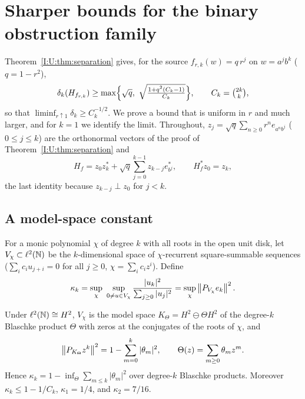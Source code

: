 \section{Sharper bounds for the binary obstruction family}\label{I:M:rev13:sec:sep}

Theorem~\ref{I:U:thm:separation} gives, for the source
$f_{r,k}(w)=q\,r^j$ on $w=a^jb^k$ ($q=1-r^2$),
\begin{equation}\label{I:M:rev13:eq:old-bound}
\delta_k(H_{f_{r,k}})\ge\max\Bigl\{\sqrt q,\ \sqrt{\tfrac{1+q^2(C_k-1)}{C_k}}\Bigr\},\qquad
C_k=\tbinom{2k}k,
\end{equation}
so that $\liminf_{r\uparrow1}\delta_k\ge C_k^{-1/2}$. We prove a bound that is uniform in
$r$ and much larger, and for $k=1$ we identify the limit. Throughout,
$z_j=\sqrt q\sum_{n\ge0}r^ne_{a^nb^j}$ ($0\le j\le k$) are the orthonormal vectors of the proof of Theorem~\ref{I:U:thm:separation} and
\[
H_f=z_0z_k^{*}+\sqrt q\sum_{j=0}^{k-1}z_{k-j}e_{b^j}^{*},\qquad
H_f^{*}z_0=z_k ,
\]
the last identity because $z_{k-j}\perp z_0$ for $j<k$.

\subsection{A model-space constant}
For a monic polynomial $\chi$ of degree $k$ with all roots in the open unit disk, let
$V_\chi\subset\ell^2(\mathbb N)$ be the $k$-dimensional space of $\chi$-recurrent square-summable
sequences ($\sum_i c_iu_{j+i}=0$ for all $j\ge0$, $\chi=\sum_ic_iz^i$). Define
\begin{equation}\label{I:M:rev13:eq:kappa}
\kappa_k=\sup_\chi\ \sup_{0\ne u\in V_\chi}\frac{|u_k|^2}{\sum_{j\ge0}|u_j|^2}
=\sup_\chi\left\lVert P_{V_\chi}e_k\right\rVert^2 .
\end{equation}
\begin{lemma}\label{I:M:rev13:lem:kappa}
Under $\ell^2(\mathbb N)\cong H^2$, $V_\chi$ is the model space $K_\Theta=H^2\ominus\Theta H^2$ of
the degree-$k$ Blaschke product $\Theta$ with zeros at the conjugates of the roots of
$\chi$, and
\[
\left\lVert P_{K_\Theta}z^k\right\rVert^2=1-\sum_{m=0}^{k}|\theta_m|^2,\qquad
\Theta(z)=\sum_{m\ge0}\theta_mz^m .
\]
Hence $\kappa_k=1-\inf_\Theta\sum_{m\le k}|\theta_m|^2$ over degree-$k$ Blaschke products.
Moreover $\kappa_k\le1-1/C_k$, $\kappa_1=1/4$, and $\kappa_2=7/16$.
\end{lemma}


